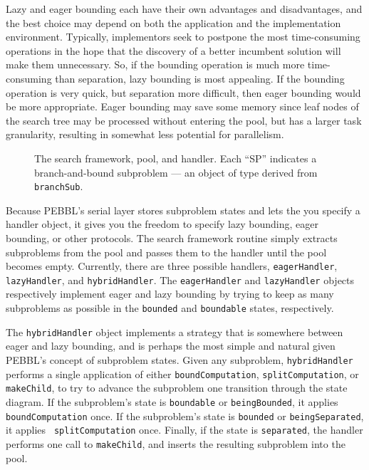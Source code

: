 Lazy and eager bounding each have their own advantages and
disadvantages, and the best choice may depend on both the application
and the implementation environment.  Typically, implementors seek to
postpone the most time-consuming operations in the hope that the
discovery of a better incumbent solution will make them unnecessary.
So, if the bounding operation is much more time-consuming than
separation, lazy bounding is most appealing.  If the bounding
operation is very quick, but separation more difficult, then eager
bounding would be more appropriate.  Eager bounding may save some
memory since leaf nodes of the search tree may be processed without
entering the pool, but has a larger task granularity, resulting in
somewhat less potential for parallelism.

\begin{figure}[tbp]
\begin{center}
\vspace{-0.2in}
\end{center}
\caption{The search framework, pool, and handler.  Each ``SP''
indicates a branch-and-bound subproblem --- an object of type derived
from \texttt{branchSub}.}
\label{fig:poolandhandler}
\end{figure}

Because PEBBL's serial layer stores subproblem states and lets the
you specify a handler object, it gives you the freedom to specify
lazy bounding, eager bounding, or other protocols.  The search
framework routine simply extracts subproblems from the pool and passes
them to the handler until the pool becomes empty.  Currently, there
are three possible handlers, \texttt{eagerHandler},
\texttt{lazyHandler}, and \texttt{hybridHandler}.  The
\texttt{eagerHandler} and \texttt{lazyHandler} objects respectively implement eager
and lazy bounding by trying to keep as many subproblems
as possible in the \texttt{bounded} and \texttt{boundable} states,
respectively.

The \texttt{hybridHandler} object implements a strategy that is somewhere
between eager and lazy bounding, and is perhaps the most simple and
natural given PEBBL's concept of subproblem states.  Given any
subproblem, \texttt{hybridHandler} performs a single application of
either \texttt{boundComputation}, \texttt{splitComputation}, or
\texttt{makeChild}, to try to advance the subproblem one transition
through the state diagram.  If the subproblem's state is
\texttt{boundable} or \texttt{beingBounded}, it applies
\texttt{boundComputation} once.  If the subproblem's state is
\texttt{bounded} or \texttt{beingSeparated}, it applies {\tt
splitComputation} once.  Finally, if the state is \texttt{separated},
the handler performs one call to \texttt{makeChild}, and inserts the
resulting subproblem into the pool.

